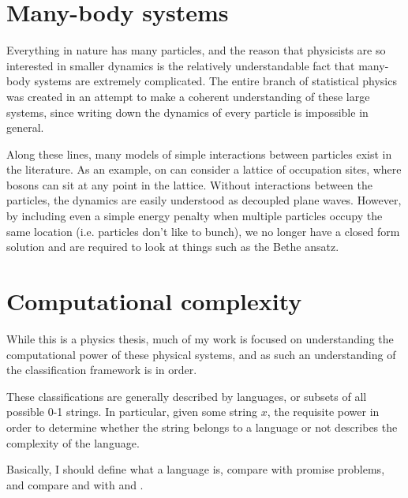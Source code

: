 
\section{Many-body systems}

Everything in nature has many particles, and the reason that physicists are so interested in smaller dynamics is the relatively understandable fact that many-body systems are extremely complicated.  The entire branch of statistical physics was created in an attempt to make a coherent understanding of these large systems, since writing down the dynamics of every particle is impossible in general.  

Along these lines, many models of simple interactions between particles exist in the literature.  As an example, on can consider a lattice of occupation sites, where bosons can sit at any point in the lattice.  Without interactions between the particles, the dynamics are easily understood as decoupled plane waves.  However, by including even a simple energy penalty when multiple particles occupy the same location (i.e. particles don't like to bunch), we no longer have a closed form solution and are required to look at things such as the Bethe ansatz.  


\section{Computational complexity}

While this is a physics thesis, much of my work is focused on understanding the computational power of these physical systems, and as such an understanding of the classification framework is in order.  

These classifications are generally described by languages, or subsets of all possible 0-1 strings.  In particular, given some string $x$, the requisite power in order to determine whether the string belongs to a language or not describes the complexity of the language.  

Basically, I should define what a language is, compare with promise problems, and compare \PP and \NP  with \BQP  and \QMA .

